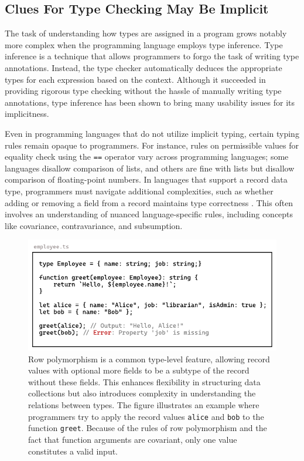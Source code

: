 \subsection{Clues For Type Checking May Be Implicit}

The task of understanding how types are assigned in a program grows notably more complex when the programming language employs type inference. Type inference \cite{Damas1982-sc} is a technique that allows programmers to forgo the task of writing type annotations. Instead, the type checker automatically deduces the appropriate types for each expression based on the context. Although it succeeded in providing rigorous type checking without the hassle of manually writing type annotations, type inference has been shown to bring many usability issues \cite{Jun2002-xp, Wand1986-lu} for its implicitness.  

Even in programming languages that do not utilize implicit typing, certain typing rules remain opaque to programmers. For instance, rules on permissible values for equality check using the \texttt{==} operator vary across programming languages; some languages disallow comparison of lists, and others are fine with lists but disallow comparison of floating-point numbers. In languages that support a record data type, programmers must navigate additional complexities, such as whether adding or removing a field from a record maintains type correctness \cite{fig:row-polymophism}. This often involves an understanding of nuanced language-specific rules, including concepts like covariance, contravariance, and subsumption.


\begin{figure}[hbt]
  \includegraphics[width=\linewidth]{RowPolymorphism.pdf}
  \caption{
    \label{fig:row-polymophism}
Row polymorphism is a common type-level feature, allowing record values with optional more fields to be a subtype of the record without these fields. This enhances flexibility in structuring data collections but also introduces complexity in understanding the relations between types. The figure illustrates an example where programmers try to apply the record values \texttt{alice} and \texttt{bob} to the function \texttt{greet}. Because of the rules of row polymorphism and the fact that function arguments are covariant, only one value constitutes a valid input. 
    }
\end{figure}

